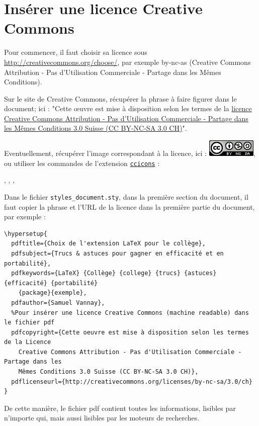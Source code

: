 \section{Insérer une licence Creative Commons}

Pour commencer, il faut choisir sa licence sous \url{http://creativecommons.org/choose/}, par exemple by-nc-as (Creative Commons Attribution - Pas d'Utilisation Commerciale - Partage dans les Mêmes Conditions).

Sur le site de Creative Commons, récupérer la phrase à faire figurer dans le document; ici : "Cette {\oe}uvre est mise à disposition selon les termes de la \href{http://creativecommons.org/licenses/by-nc-sa/3.0/ch/deed.fr}{licence Creative Commons Attribution - Pas d'Utilisation Commerciale - Partage dans les Mêmes Conditions 3.0 Suisse (CC BY-NC-SA 3.0 CH)}".

Eventuellement, récupérer l'image correspondant à la licence, ici : \includegraphics[height=2ex]{images/licence_CC_BY_NC_SA}, ou utiliser les commandes de l'extension \href{http://mirror.ctan.org/fonts/ccicons/ccicons.pdf}{\texttt{ccicons}} :
\begin{LTXexample}[pos=o,width=.15]
\ccLogo, \ccAttribution, \ccNonCommercial, \ccShareAlike
\end{LTXexample}

Dans le fichier \texttt{styles_document.sty}, dans la première section du document, il faut copier la phrase et l'URL de la licence dans la première partie du document, par exemple :	
\begin{verbatim}
\hypersetup{
  pdftitle={Choix de l'extension LaTeX pour le collège},
  pdfsubject={Trucs & astuces pour gagner en efficacité et en portabilité},
  pdfkeywords={LaTeX} {Collège} {college} {trucs} {astuces} {efficacité} {portabilité}
    {package}{exemple},
  pdfauthor={Samuel Vannay},
  %Pour insérer une licence Creative Commons (machine readable) dans le fichier pdf
  pdfcopyright={Cette oeuvre est mise à disposition selon les termes de la Licence 
    Creative Commons Attribution - Pas d'Utilisation Commerciale - Partage dans les
    Mêmes Conditions 3.0 Suisse (CC BY-NC-SA 3.0 CH)},
  pdflicenseurl={http://creativecommons.org/licenses/by-nc-sa/3.0/ch}
}
\end{verbatim}

De cette manière, le fichier pdf contient toutes les informations, lisibles par n'importe qui, mais aussi lisibles par les moteurs de recherches.